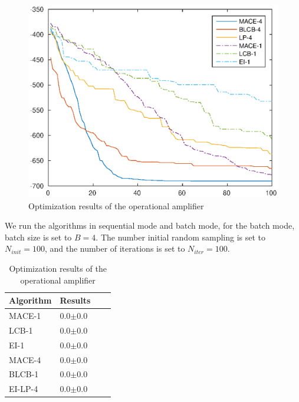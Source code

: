 \begin{figure}[]
\vskip 0.2in
\begin{center}
\centerline{\includegraphics[width=\columnwidth]{./img/mean_DAC2014.eps}}
\caption{Optimization results of the operational amplifier}
\label{fig:resDAC2014}
\end{center}
\vskip -0.2in
\end{figure}

We run the algorithms in sequential mode and batch mode, for the batch
mode, batch size is set to $B = 4$. The number initial random sampling is set
to $N_{init} = 100$, and the number of iterations is set to $N_{iter} = 100$.


\begin{table}[h]
    \centering
    \caption{Optimization results of the operational amplifier}
    \label{tab:result_opamp}
    \begin{tabular}{llll}
        \toprule
        Algorithm & Results     \\ \midrule
        MACE-1    & 0.0$\pm$0.0 \\
        LCB-1     & 0.0$\pm$0.0 \\
        EI-1      & 0.0$\pm$0.0 \\
        MACE-4    & 0.0$\pm$0.0 \\
        BLCB-1    & 0.0$\pm$0.0 \\
        EI-LP-4   & 0.0$\pm$0.0 \\
        \bottomrule
    \end{tabular}
\end{table}

